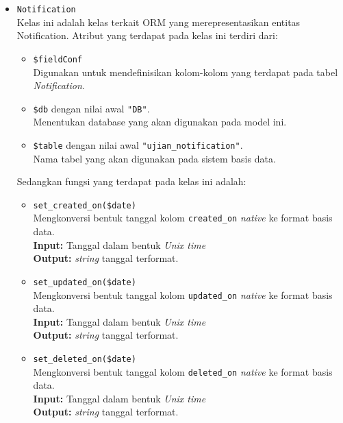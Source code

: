 \begin{itemize}
        \item \texttt{Notification} \\
            Kelas ini adalah kelas terkait ORM yang merepresentasikan entitas
            Notification. Atribut yang terdapat pada kelas ini terdiri dari:
            \begin{itemize}
                \item \texttt{\$fieldConf} \\
                    Digunakan untuk mendefinisikan kolom-kolom yang terdapat
                    pada tabel \textit{Notification}.
                \item \texttt{\$db} dengan nilai awal \texttt{"DB"}. \\
                    Menentukan database yang akan digunakan pada model ini.
                \item \texttt{\$table} dengan nilai awal
                \texttt{"ujian\_notification"}. \\
                    Nama tabel yang akan digunakan pada sistem basis data. 
            \end{itemize}
            Sedangkan fungsi yang terdapat pada kelas ini adalah:
            \begin{itemize}
                \item \texttt{set\_created\_on(\$date)} \\
                    Mengkonversi bentuk tanggal kolom \texttt{created\_on}
                    \textit{native} ke format basis data. \\
                    \textbf{Input:} Tanggal dalam bentuk \textit{Unix time}\\
                    \textbf{Output:} \textit{string} tanggal terformat.
                
                \item \texttt{set\_updated\_on(\$date)} \\
                    Mengkonversi bentuk tanggal kolom \texttt{updated\_on}
                    \textit{native} ke format basis data. \\
                    \textbf{Input:} Tanggal dalam bentuk \textit{Unix time}\\
                    \textbf{Output:} \textit{string} tanggal terformat.
                    
                \item \texttt{set\_deleted\_on(\$date)} \\
                    Mengkonversi bentuk tanggal kolom \texttt{deleted\_on}
                    \textit{native} ke format basis data. \\
                    \textbf{Input:} Tanggal dalam bentuk \textit{Unix time}\\
                    \textbf{Output:} \textit{string} tanggal terformat.
                    

\end{itemize}
\end{itemize}
